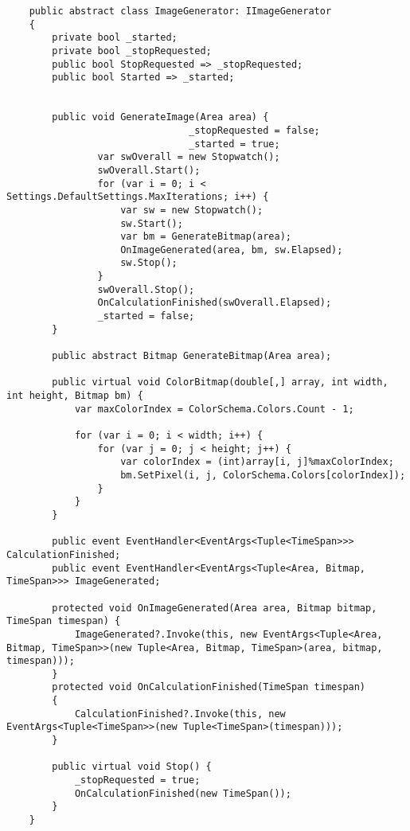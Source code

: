 \documentclass[a4paper,ngerman]{scrartcl}
\begin{document}
\begin{lstlisting}
    public abstract class ImageGenerator: IImageGenerator
    {
        private bool _started;
        private bool _stopRequested;
        public bool StopRequested => _stopRequested;
        public bool Started => _started;
        

        public void GenerateImage(Area area) {
								_stopRequested = false;
								_started = true;
                var swOverall = new Stopwatch();
                swOverall.Start();
                for (var i = 0; i < Settings.DefaultSettings.MaxIterations; i++) {
                    var sw = new Stopwatch();
                    sw.Start();
                    var bm = GenerateBitmap(area);
                    OnImageGenerated(area, bm, sw.Elapsed);
                    sw.Stop();
                }
                swOverall.Stop();
                OnCalculationFinished(swOverall.Elapsed);
                _started = false;
        }

        public abstract Bitmap GenerateBitmap(Area area);

        public virtual void ColorBitmap(double[,] array, int width, int height, Bitmap bm) {
            var maxColorIndex = ColorSchema.Colors.Count - 1;

            for (var i = 0; i < width; i++) {
                for (var j = 0; j < height; j++) {
                    var colorIndex = (int)array[i, j]%maxColorIndex;
                    bm.SetPixel(i, j, ColorSchema.Colors[colorIndex]);
                }
            }
        }

        public event EventHandler<EventArgs<Tuple<TimeSpan>>> CalculationFinished;
        public event EventHandler<EventArgs<Tuple<Area, Bitmap, TimeSpan>>> ImageGenerated;

        protected void OnImageGenerated(Area area, Bitmap bitmap, TimeSpan timespan) {
            ImageGenerated?.Invoke(this, new EventArgs<Tuple<Area, Bitmap, TimeSpan>>(new Tuple<Area, Bitmap, TimeSpan>(area, bitmap, timespan)));
        }
        protected void OnCalculationFinished(TimeSpan timespan)
        {
            CalculationFinished?.Invoke(this, new EventArgs<Tuple<TimeSpan>>(new Tuple<TimeSpan>(timespan)));
        }

        public virtual void Stop() {
            _stopRequested = true;
            OnCalculationFinished(new TimeSpan());
        }
    }

\end{lstlisting}
\end{document}

